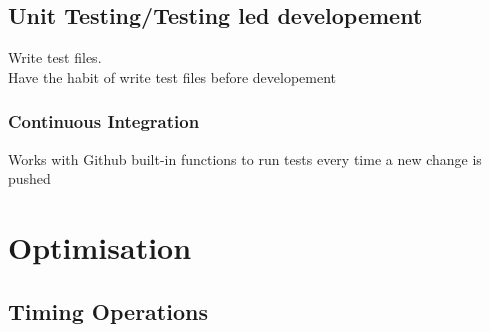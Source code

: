 \documentclass[12pt,a4paper]{article}
\begin{document}
\subsection{Unit Testing/Testing led developement}
    Write test files.\\
    Have the habit of write test files before developement
\subsubsection{Continuous Integration}
    Works with Github built-in functions to run tests every time a new change is pushed 

\section{Optimisation}
\subsection{Timing Operations}
\end{document}
